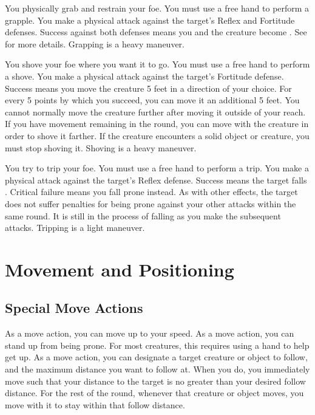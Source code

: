             \label{Grapple} You physically grab and restrain your foe.
            You must use a free hand to perform a grapple.
            You make a physical attack against the target's Reflex and Fortitude defenses.
            Success against both defenses means you and the creature become \grappled.
            See  for more details.
            Grapping is a heavy maneuver.

            \label{Shove} You shove your foe where you want it to go.
            You must use a free hand to perform a shove.
            You make a physical attack against the target's Fortitude defense.
            Success means you move the creature 5 feet in a direction of your choice.
            For every 5 points by which you succeed, you can move it an additional 5 feet.
            You cannot normally move the creature further after moving it outside of your reach.
            If you have movement remaining in the round, you can move with the creature in order to shove it farther.
            If the creature encounters a solid object or creature, you must stop shoving it.
            Shoving is a heavy maneuver.

            \label{Trip} You try to trip your foe.
            You must use a free hand to perform a trip.
            You make a physical attack against the target's Reflex defense.
            Success means the target falls \prone.
            Critical failure means you fall prone instead.
            As with other effects, the target does not suffer penalties for being prone against your other attacks within the same round.
            It is still in the process of falling as you make the subsequent attacks.
            Tripping is a light maneuver.

\section{Movement and Positioning}

    \subsection{Special Move Actions}

         As a move action, you can move up to your speed.
         As a move action, you can stand up from being prone. For most creatures, this requires using a hand to help get up.
         As a move action, you can designate a target creature or object to follow, and the maximum distance you want to follow at. When you do, you immediately move such that your distance to the target is no greater than your desired follow distance. For the rest of the round, whenever that creature or object moves, you move with it to stay within that follow distance.

